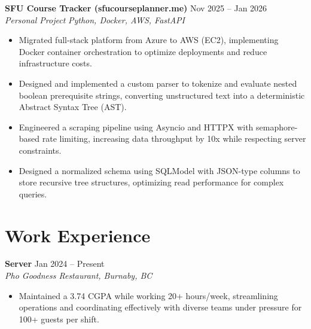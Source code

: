\documentclass[10pt, letterpaper]{article}
\begin{document}
\vspace{3pt}
\noindent
\textbf{SFU Course Tracker (sfucourseplanner.me)} \hfill Nov 2025 -- Jan 2026 \\
\textit{Personal Project} \hfill \textit{Python, Docker, AWS, FastAPI}
\begin{itemize}
    \item Migrated full-stack platform from Azure to AWS (EC2), implementing Docker container orchestration to optimize deployments and reduce infrastructure costs.
    \item Designed and implemented a custom parser to tokenize and evaluate nested boolean prerequisite strings, converting unstructured text into a deterministic Abstract Syntax Tree (AST).
    \item Engineered a scraping pipeline using Asyncio and HTTPX with semaphore-based rate limiting, increasing data throughput by 10x while respecting server constraints.
    \item Designed a normalized schema using SQLModel with JSON-type columns to store recursive tree structures, optimizing read performance for complex queries.
\end{itemize}

\section*{Work Experience}

\noindent
\textbf{Server} \hfill Jan 2024 -- Present \\
\textit{Pho Goodness Restaurant, Burnaby, BC}
\begin{itemize}
    \item Maintained a 3.74 CGPA while working 20+ hours/week, streamlining operations and coordinating effectively with diverse teams under pressure for 100+ guests per shift.
\end{itemize}
\end{document}
